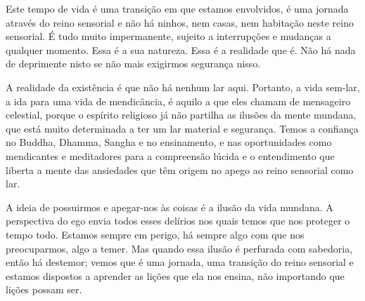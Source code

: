 Este tempo de vida é uma transição em que estamos envolvidos, é uma jornada
através do reino sensorial e não há ninhos, nem casas, nem habitação neste reino
sensorial. É tudo muito impermanente, sujeito a interrupções e mudanças a
qualquer momento. Essa é a sua natureza. Essa é a realidade que é. Não há nada
de deprimente nisto se não mais exigirmos segurança nisso.

A realidade da existência é que não há nenhum lar aqui. Portanto, a vida
sem-lar, a ida para uma vida de mendicância, é aquilo a que eles chamam de
mensageiro celestial, porque o espírito religioso já não partilha as ilusões da
mente mundana, que está muito determinada a ter um lar material e segurança.
Temos a confiança no Buddha, Dhamma, Sangha e no ensinamento, e nas
oportunidades como mendicantes e meditadores para a compreensão lúcida e o
entendimento que liberta a mente das ansiedades que têm origem no apego ao reino
sensorial como lar.

A ideia de possuirmos e apegar-nos às coisas é a ilusão da vida mundana. A
perspectiva do ego envia todos esses delírios nos quais temos que nos proteger o
tempo todo. Estamos sempre em perigo, há sempre algo com que nos preocuparmos,
algo a temer. Mas quando essa ilusão é perfurada com sabedoria, então há
destemor; vemos que é uma jornada, uma transição do reino sensorial e estamos
dispostos a aprender as lições que ela nos ensina, não importando que lições
possam ser.
